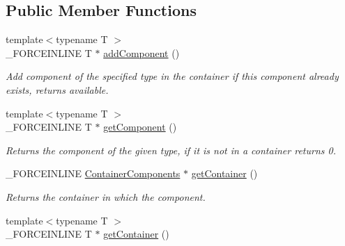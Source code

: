 \subsection*{Public Member Functions}
\begin{DoxyCompactItemize}
\item 
\hypertarget{classcsad_1_1_component_ac35c5ad8712eb403c8bbc3c765f823b8}{{\footnotesize template$<$typename T $>$ }\\\-\_\-\-F\-O\-R\-C\-E\-I\-N\-L\-I\-N\-E T $\ast$ \hyperlink{classcsad_1_1_component_ac35c5ad8712eb403c8bbc3c765f823b8}{add\-Component} ()}\label{classcsad_1_1_component_ac35c5ad8712eb403c8bbc3c765f823b8}

\begin{DoxyCompactList}\small\item\em Add component of the specified type in the container if this component already exists, returns available. \end{DoxyCompactList}\item 
\hypertarget{classcsad_1_1_component_a3ec7ad4398b3b793561d84a7c3a3eef6}{{\footnotesize template$<$typename T $>$ }\\\-\_\-\-F\-O\-R\-C\-E\-I\-N\-L\-I\-N\-E T $\ast$ \hyperlink{classcsad_1_1_component_a3ec7ad4398b3b793561d84a7c3a3eef6}{get\-Component} ()}\label{classcsad_1_1_component_a3ec7ad4398b3b793561d84a7c3a3eef6}

\begin{DoxyCompactList}\small\item\em Returns the component of the given type, if it is not in a container returns 0. \end{DoxyCompactList}\item 
\hypertarget{classcsad_1_1_component_a00511e79db1c90f291e17b87c7e62696}{\-\_\-\-F\-O\-R\-C\-E\-I\-N\-L\-I\-N\-E \hyperlink{classcsad_1_1_container_components}{Container\-Components} $\ast$ \hyperlink{classcsad_1_1_component_a00511e79db1c90f291e17b87c7e62696}{get\-Container} ()}\label{classcsad_1_1_component_a00511e79db1c90f291e17b87c7e62696}

\begin{DoxyCompactList}\small\item\em Returns the container in which the component. \end{DoxyCompactList}\item 
\hypertarget{classcsad_1_1_component_ac5408f7b7ebe3b6b2141d4c7fb8146fe}{{\footnotesize template$<$typename T $>$ }\\\-\_\-\-F\-O\-R\-C\-E\-I\-N\-L\-I\-N\-E T $\ast$ \hyperlink{classcsad_1_1_component_ac5408f7b7ebe3b6b2141d4c7fb8146fe}{get\-Container} ()}\label{classcsad_1_1_component_ac5408f7b7ebe3b6b2141d4c7fb8146fe}


\end{DoxyCompactItemize}
